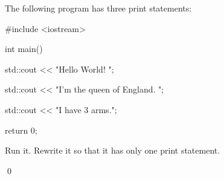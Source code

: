 The following program has three print statements: 

\begin{console}

#include <iostream>



int main()

{

    std::cout << "Hello World! ";

    std::cout << "I'm the queen of England. ";

    std::cout << "I have 3 arms.";



    return 0;

}

\end{console}

Run it. Rewrite it so that it has only one print statement. 

\qed

